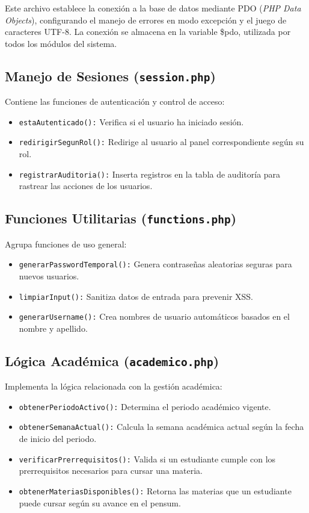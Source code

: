 \documentclass[12pt, letterpaper, oneside]{report}
\begin{document}
Este archivo establece la conexi\'on a la base de datos mediante PDO (\textit{PHP Data Objects}), configurando el manejo de errores en modo excepci\'on y el juego de caracteres UTF-8. La conexi\'on se almacena en la variable \$pdo, utilizada por todos los m\'odulos del sistema.

\subsection*{Manejo de Sesiones (\texttt{session.php})}

Contiene las funciones de autenticaci\'on y control de acceso:
\begin{itemize}
  \item \texttt{estaAutenticado():} Verifica si el usuario ha iniciado sesi\'on.
  \item \texttt{redirigirSegunRol():} Redirige al usuario al panel correspondiente seg\'un su rol.
  \item \texttt{registrarAuditoria():} Inserta registros en la tabla de auditor\'ia para rastrear las acciones de los usuarios.
\end{itemize}

\subsection*{Funciones Utilitarias (\texttt{functions.php})}

Agrupa funciones de uso general:
\begin{itemize}
  \item \texttt{generarPasswordTemporal():} Genera contrase\~nas aleatorias seguras para nuevos usuarios.
  \item \texttt{limpiarInput():} Sanitiza datos de entrada para prevenir XSS.
  \item \texttt{generarUsername():} Crea nombres de usuario autom\'aticos basados en el nombre y apellido.
\end{itemize}

\subsection*{L\'ogica Acad\'emica (\texttt{academico.php})}

Implementa la l\'ogica relacionada con la gesti\'on acad\'emica:
\begin{itemize}
  \item \texttt{obtenerPeriodoActivo():} Determina el periodo acad\'emico vigente.
  \item \texttt{obtenerSemanaActual():} Calcula la semana acad\'emica actual seg\'un la fecha de inicio del periodo.
  \item \texttt{verificarPrerrequisitos():} Valida si un estudiante cumple con los prerrequisitos necesarios para cursar una materia.
  \item \texttt{obtenerMateriasDisponibles():} Retorna las materias que un estudiante puede cursar seg\'un su avance en el pensum.
\end{itemize}
\end{document}
